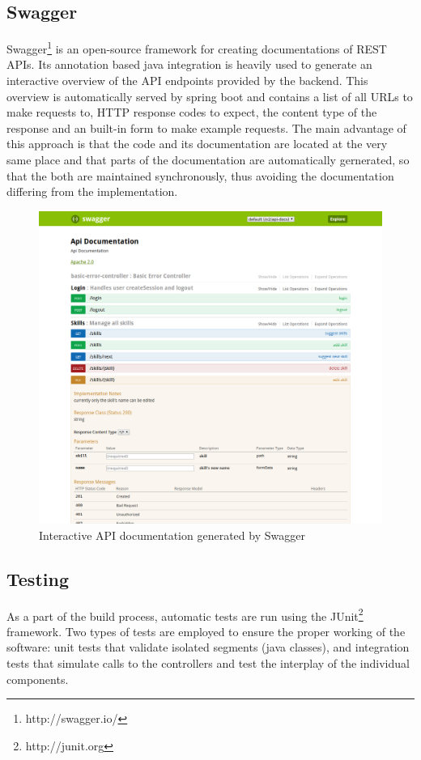 \subsection{Swagger}
Swagger\footnote{http://swagger.io/} is an open-source framework for creating documentations of REST APIs.
Its annotation based java integration is heavily used to generate an interactive overview of the API endpoints provided by the
backend. This overview is automatically served by spring boot and contains a list of all URLs to make requests to, HTTP response codes to expect, the content type of the response and an built-in form to make example requests. The main advantage of this approach is that the code and its documentation are located at the very same place and that parts of the documentation are automatically gernerated, so that the both are maintained synchronously, thus avoiding the documentation differing from the implementation.
\begin{figure}[H]
    \centering
    \includegraphics[width=\textwidth]{images/swagger_ui.png}
    \caption[Swagger Interactive Documentation]{Interactive API documentation generated by Swagger}
    \label{fig:markovchain}
\end{figure}

\subsection{Testing}
As a part of the build process, automatic tests are run using the JUnit\footnote{http://junit.org} framework. Two types of tests are employed to ensure the proper working of the software: unit tests that validate isolated segments (java classes), and integration tests that simulate calls to the controllers and test the
interplay of the individual components.

